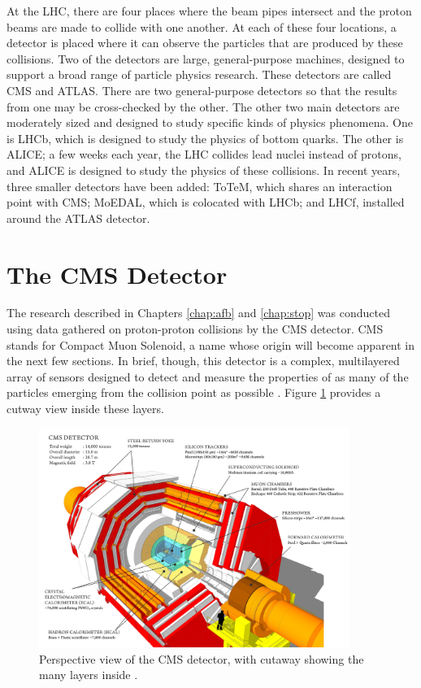 At the LHC, there are four places where the beam pipes intersect and
the proton beams are made to collide with one another. At each of these
four locations, a detector is placed where it can observe the
particles that are produced by these collisions. Two of
the detectors are large, general-purpose machines, designed to support
a broad range of particle physics research. These detectors are called CMS
and ATLAS. There are two general-purpose detectors so that the results from one
may be cross-checked by the other. The other two main
detectors are moderately sized and designed to study specific kinds of physics
phenomena. One is LHCb, which is designed to study the physics of
bottom quarks. The other is ALICE; a few weeks each year, the LHC
collides lead nuclei instead of protons, and ALICE is designed to
study the physics of these collisions. In recent years, three smaller detectors have
been added: ToTeM, which shares an interaction point with CMS; MoEDAL,
which is colocated with LHCb; and LHCf, installed around the ATLAS detector.

\section{The CMS Detector}
\label{sec:cms}

The research described in Chapters \ref{chap:afb} and \ref{chap:stop}
was conducted using data gathered on proton-proton collisions by the
CMS detector. CMS stands for Compact Muon Solenoid, a name whose
origin will become apparent in the next few sections. In brief, though,
this detector is a complex, multilayered array of sensors designed to
detect and measure the properties of as many of the particles emerging
from the collision point as possible \cite{cms}. Figure
\ref{fig:cms:outside} provides a cutway view inside these layers.

\begin{figure}[htb]
\centering
\includegraphics[width=0.9\textwidth]{figures/cms-cutaway.png}
\caption[Perspective view of the CMS detector, with cutaway showing
the many layers inside.]{Perspective view of the CMS detector, with
  cutaway showing the many layers inside \cite{websitecms}.}
\label{fig:cms:outside}
\end{figure}

